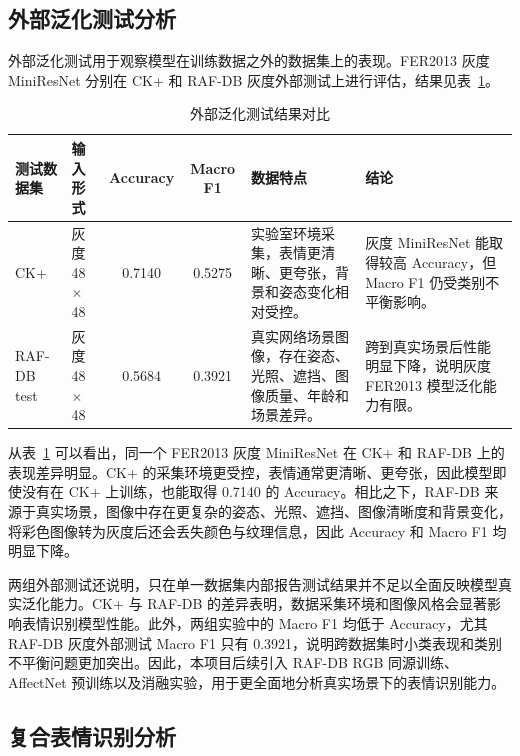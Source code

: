 \documentclass[UTF8,a4paper,12pt]{ctexart}
\begin{document}
\subsection{外部泛化测试分析}

外部泛化测试用于观察模型在训练数据之外的数据集上的表现。FER2013 灰度 MiniResNet 分别在 CK+ 和 RAF-DB 灰度外部测试上进行评估，结果见表~\ref{tab:external_generalization}。

\begin{table}[H]
  \centering
  \caption{外部泛化测试结果对比}
  \label{tab:external_generalization}
  \small
  \setlength{\tabcolsep}{4pt}
  \renewcommand{\arraystretch}{1.15}
  \begin{tabularx}{\textwidth}{p{}p{}ccp{}X}
    \toprule
    测试数据集 & 输入形式 & Accuracy & Macro F1 & 数据特点 & 结论 \\
    \midrule
    CK+ & 灰度 48$\times$48 & 0.7140 & 0.5275 & 实验室环境采集，表情更清晰、更夸张，背景和姿态变化相对受控。 & 灰度 MiniResNet 能取得较高 Accuracy，但 Macro F1 仍受类别不平衡影响。\\
    RAF-DB test & 灰度 48$\times$48 & 0.5684 & 0.3921 & 真实网络场景图像，存在姿态、光照、遮挡、图像质量、年龄和场景差异。 & 跨到真实场景后性能明显下降，说明灰度 FER2013 模型泛化能力有限。\\
    \bottomrule
  \end{tabularx}
\end{table}

从表~\ref{tab:external_generalization} 可以看出，同一个 FER2013 灰度 MiniResNet 在 CK+ 和 RAF-DB 上的表现差异明显。CK+ 的采集环境更受控，表情通常更清晰、更夸张，因此模型即使没有在 CK+ 上训练，也能取得 0.7140 的 Accuracy。相比之下，RAF-DB 来源于真实场景，图像中存在更复杂的姿态、光照、遮挡、图像清晰度和背景变化，将彩色图像转为灰度后还会丢失颜色与纹理信息，因此 Accuracy 和 Macro F1 均明显下降。

两组外部测试还说明，只在单一数据集内部报告测试结果并不足以全面反映模型真实泛化能力。CK+ 与 RAF-DB 的差异表明，数据采集环境和图像风格会显著影响表情识别模型性能。此外，两组实验中的 Macro F1 均低于 Accuracy，尤其 RAF-DB 灰度外部测试 Macro F1 只有 0.3921，说明跨数据集时小类表现和类别不平衡问题更加突出。因此，本项目后续引入 RAF-DB RGB 同源训练、AffectNet 预训练以及消融实验，用于更全面地分析真实场景下的表情识别能力。

\subsection{复合表情识别分析}
\end{document}
